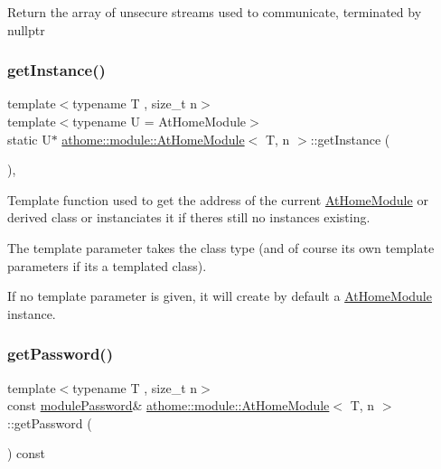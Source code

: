 Return the array of unsecure streams used to communicate, terminated by nullptr \mbox{\label{classathome_1_1module_1_1_at_home_module_acc6e7fc0d86f11648fd81729484e546f}} 
\subsubsection{\texorpdfstring{get\+Instance()}{getInstance()}}
{\footnotesize\ttfamily template$<$typename T , size\+\_\+t n$>$ \\
template$<$typename U  = At\+Home\+Module$>$ \\
static U$\ast$ \mbox{\hyperlink{classathome_1_1module_1_1_at_home_module}{athome\+::module\+::\+At\+Home\+Module}}$<$ T, n $>$\+::get\+Instance (\begin{DoxyParamCaption}{ }\end{DoxyParamCaption})\hspace{0.3cm}{\ttfamily [inline]}, {\ttfamily [static]}}

Template function used to get the address of the current \mbox{\hyperlink{classathome_1_1module_1_1_at_home_module}{At\+Home\+Module}} or derived class or instanciates it if there\textquotesingle{}s still no instances existing.

The template parameter takes the class type (and of course it\textquotesingle{}s own template parameters if it\textquotesingle{}s a templated class).

If no template parameter is given, it will create by default a \mbox{\hyperlink{classathome_1_1module_1_1_at_home_module}{At\+Home\+Module}} instance. \mbox{\label{classathome_1_1module_1_1_at_home_module_af322578d47001b20d5e5fb8da65dbf93}} 
\subsubsection{\texorpdfstring{get\+Password()}{getPassword()}}
{\footnotesize\ttfamily template$<$typename T , size\+\_\+t n$>$ \\
const \mbox{\hyperlink{classathome_1_1module_1_1_at_home_module_a628bd00cf83073b87c41a3ce2b362a9c}{module\+Password}}\& \mbox{\hyperlink{classathome_1_1module_1_1_at_home_module}{athome\+::module\+::\+At\+Home\+Module}}$<$ T, n $>$\+::get\+Password (\begin{DoxyParamCaption}{ }\end{DoxyParamCaption}) const\hspace{0.3cm}{\ttfamily [inline]}}

